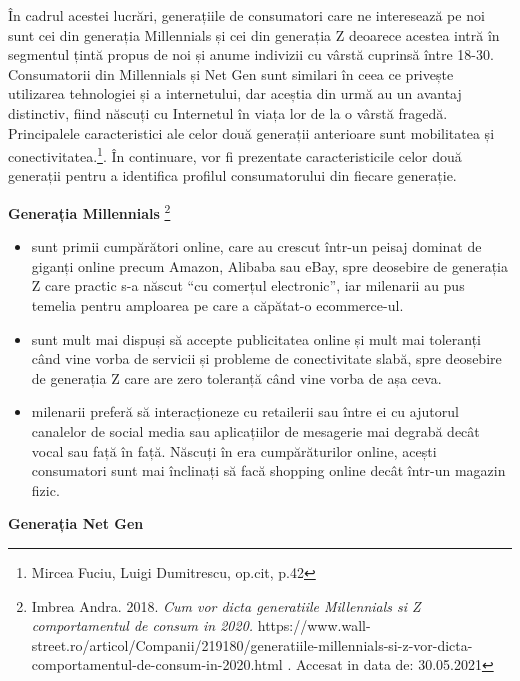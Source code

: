 \documentclass[a4paper, 12pt]{article}
\begin{document}
		\quad În cadrul acestei lucrări, generațiile de consumatori  care ne interesează pe noi sunt cei din generația Millennials și cei din generația Z deoarece acestea intră în segmentul țintă propus de noi și anume indivizii cu vârstă cuprinsă între 18-30. Consumatorii din Millennials și Net Gen sunt similari în ceea ce privește utilizarea tehnologiei și a internetului, dar aceștia din urmă au un avantaj distinctiv, fiind născuți cu Internetul în viața lor de la o vârstă fragedă. Principalele caracteristici ale celor două generații anterioare sunt mobilitatea și conectivitatea.\footnote{Mircea Fuciu, Luigi Dumitrescu, op.cit, p.42}. În continuare, vor fi prezentate caracteristicile celor două generații pentru a identifica profilul consumatorului din fiecare generație.
	\bigskip
	
		\quad\textbf{ Generația Millennials }\footnote{Imbrea Andra. 2018.\textit{ Cum vor dicta generatiile Millennials si Z comportamentul de consum in 2020.} https://www.wall-street.ro/articol/Companii/219180/generatiile-millennials-si-z-vor-dicta-comportamentul-de-consum-in-2020.html . Accesat in data de: 30.05.2021}
		\begin{itemize}
			\item sunt primii cumpărători online, care au crescut într-un peisaj dominat de giganți online precum Amazon, Alibaba sau eBay, spre deosebire de generația Z care practic s-a născut “cu comerțul electronic”, iar milenarii au pus temelia pentru amploarea pe care a căpătat-o ecommerce-ul.
			\item sunt mult mai dispuși să accepte publicitatea online și mult mai toleranți când vine vorba de servicii și probleme de conectivitate slabă, spre deosebire de generația Z care are zero toleranță când vine vorba de așa ceva.
			\item milenarii preferă să interacționeze cu retailerii sau între ei cu ajutorul canalelor de social media sau aplicațiilor de mesagerie mai degrabă decât vocal sau față în față. Născuți în era cumpărăturilor online, acești consumatori sunt mai înclinați să facă shopping online decât într-un magazin fizic. 
		\end{itemize}
		\quad \textbf{Generația Net Gen}
\end{document}
